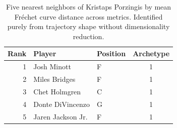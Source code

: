 \begin{table}[htbp]
  \centering\small
  \begin{tabular}{rllc}
    \toprule
    Rank & Player & Position & Archetype \\
    \midrule
    1 & Josh Minott & F & 1 \\
    2 & Miles Bridges & F & 1 \\
    3 & Chet Holmgren & C & 1 \\
    4 & Donte DiVincenzo & G & 1 \\
    5 & Jaren Jackson Jr. & F & 1 \\
    \bottomrule
  \end{tabular}
  \caption{Five nearest neighbors of Kristaps Porzingis by mean Fr\'{e}chet curve distance across metrics. Identified purely from trajectory shape without dimensionality reduction.}
  \label{tab:Kristaps_Porzingis_frechet_curve_neighbors}
\end{table}

